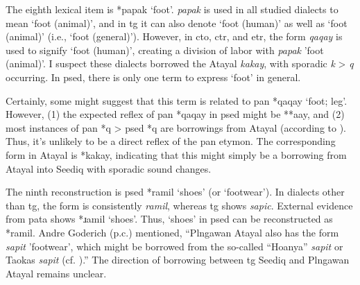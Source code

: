 The eighth lexical item is *papak `foot'. \textit{papak} is used in all studied dialects to mean `foot (animal)', and in \acl{tg} it can also denote `foot (human)' as well as `foot (animal)' (i.e., `foot (general)'). However, in \acl{cto}, \acl{ctr}, and \acl{etr}, the form \textit{qaqay} is used to signify `foot (human)', creating a division of labor with \textit{papak} 'foot (animal)'. I suspect these dialects borrowed the Atayal \textit{kakay}, with sporadic \textit{k} > \textit{q} occurring. In \acl{psed}, there is only one term to express `foot' in general.


Certainly, some might suggest that this term is related to \acl{pan} *qaqay `foot; leg'. However, (1) the expected reflex of \acs{pan} *qaqay in \acl{psed} might be **aay, and (2) most instances of \acs{pan} *q > \acs{psed} *q are borrowings from Atayal (according to \textcite{song2024sedq}). Thus, it's unlikely to be a direct reflex of the \acs{pan} etymon. The corresponding form in Atayal is *kakay, indicating that this might simply be a borrowing from Atayal into Seediq with sporadic sound changes.


The ninth reconstruction is \acl{psed} *ramil `shoes' (or `footwear'). In dialects other than \acl{tg}, the form is consistently \textit{ramil}, whereas \acl{tg} shows \textit{sapic}. External evidence from \acl{pata} shows *ɹamil `shoes'. Thus, `shoes' in \acl{psed} can be reconstructed as *ramil. Andre Goderich (p.c.) mentioned, ``Plngawan Atayal also has the form \textit{sapit} 'footwear', which might be borrowed from the so-called ``Hoanya'' \textit{sapit} or Taokas \textit{sapit} (cf. \cite[80]{tsuchida1982wp}).'' The direction of borrowing between \acl{tg} Seediq and Plngawan Atayal remains unclear.

